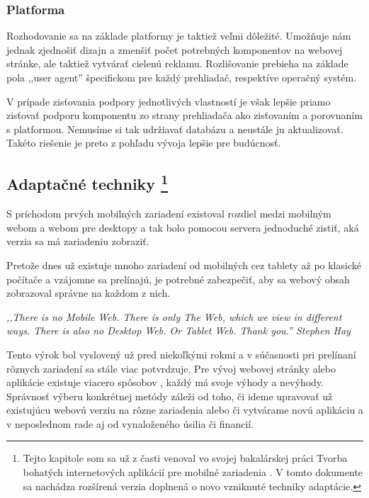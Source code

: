 
\newpage
\subsubsection{Platforma} %
\label{ssub:platforma}

Rozhodovanie sa na základe platformy je taktiež veľmi dôležité. Umožňuje nám jednak zjednošiť dizajn a zmenšiť počet potrebných komponentov na webovej stránke, ale taktiež vytvárať cielenú reklamu. Rozlišovanie prebieha na základe pola ,,user agent'' špecifickom pre každý prehliadač, respektíve operačný systém.

V prípade zisťovania podpory jednotlivých vlastností je však lepšie priamo zisťovať podporu komponentu zo strany prehliadača ako zisťovaním a porovnaním s platformou. Nemusíme si tak udržiavať databázu a neustále ju aktualizovať. Takéto riešenie je preto z pohľadu vývoja lepšie pre budúcnosť.




\subsection{Adaptačné techniky \footnote{Tejto kapitole som sa už z časti venoval vo svojej bakalárskej práci Tvorba bohatých internetových aplikácií pre mobilné zariadenia \cite{ja}. V tomto dokumente sa nachádza rozšírená verzia doplnená o novo vzniknuté techniky adaptácie.}} %
\label{sub:adapta_n_techniky}

S príchodom prvých mobilných zariadení existoval rozdiel medzi mobilným webom a webom pre desktopy a tak bolo pomocou servera jednoduché zistiť, aká verzia sa má zariadeniu zobraziť.

Pretože dnes už existuje mnoho zariadení od mobilných cez tablety až po klasické počítače a vzájomne sa prelínajú, je potrebné zabezpečiť, aby sa webový obsah zobrazoval správne na každom z nich.

\begin{fancybox}
\textit{,,There is no Mobile Web. There is only The Web, which we view in different ways. There is also no Desktop Web. Or Tablet Web. Thank you.'' Stephen Hay} \cite{noMobileWeb}
\end{fancybox}

Tento výrok bol vyslovený už pred niekoľkými rokmi a v súčasnosti pri prelínaní rôznych zariadení sa stále viac potvrdzuje. Pre vývoj webovej stránky alebo aplikácie existuje viacero spôsobov \cite{mobiforge}, každý má svoje výhody a nevýhody. Správnosť výberu konkrétnej metódy záleži od toho, či ideme upravovať už existujúcu webovú verziu na rôzne zariadenia alebo či vytvárame novú aplikáciu a v neposlednom rade aj od vynaloženého úsilia či financií.


